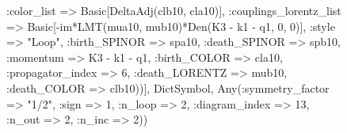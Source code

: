 \documentclass{revtex4}
\begin{document}
\begin{figure}[!htb]
\begin{center}
{:color_list => Basic[DeltaAdj(clb10, cla10)], :couplings_lorentz_list => Basic[-im*LMT(mua10, mub10)*Den(K3 - k1 - q1, 0, 0)], :style => "Loop", :birth_SPINOR => spa10, :death_SPINOR => spb10, :momentum => K3 - k1 - q1, :birth_COLOR => cla10, :propagator_index => 6, :death_LORENTZ => mub10, :death_COLOR => clb10))], Dict{Symbol, Any}(:symmetry_factor => "1/2", :sign => 1, :n_loop => 2, :diagram_index => 13, :n_out => 2, :n_inc => 2)) 
}
\end{center}
\end{figure}
\end{document}
